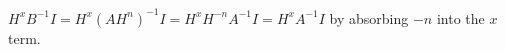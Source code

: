 \documentclass[preview]{standalone}
\begin{document}
\begin{flushleft}
$H^xB^{-1}I=H^x(AH^n)^{-1}I=H^xH^{-n}A^{-1}I=H^xA^{-1}I$ by absorbing $-n$ into the $x$ term.
\end{flushleft}
\end{document}
